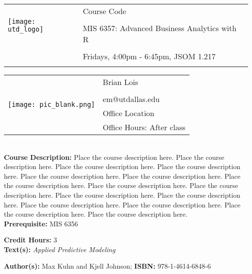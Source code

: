 \documentclass[11pt]{article}
\begin{document}
\begin{tabular}{ l l }
  \multirow{3}{*}{\texttt{[image: utd\_logo]}} & \LARGE Course Code \\\\
  & \LARGE MIS 6357: Advanced Business Analytics with R \\\\
  & \LARGE Fridays, 4:00pm - 6:45pm, JSOM 1.217 \\\\
\end{tabular}
\vspace{10mm}

\begin{tabular}{ l l }
  \multirow{6}{*}{\texttt{[image: pic\_blank.png]}} & \large Brian Lois \\\\
  & \large em@utdallas.edu \\
  & \large Office Location \\
  & \large Office Hours: After class \\
\end{tabular}
\vspace{5mm}

\textbf {\large \\ Course Description:} Place the course description here. Place the course description here. Place the course description here. Place the course description here. Place the course description here. Place the course description here. Place the course description here. Place the course description here. Place the course description here. Place the course description here. Place the course description here. Place the course description here. Place the course description here. Place the course description here. Place the course description here. \\
\textbf {Prerequisite:} MIS 6356

\textbf {Credit Hours:} 3 \\

\textbf {\large Text(s):} \emph{Applied Predictive Modeling}

\textbf {Author(s):} Max Kuhn and Kjell Johnson;  \textbf {ISBN:} 978-1-4614-6848-6 \\
\end{document}
